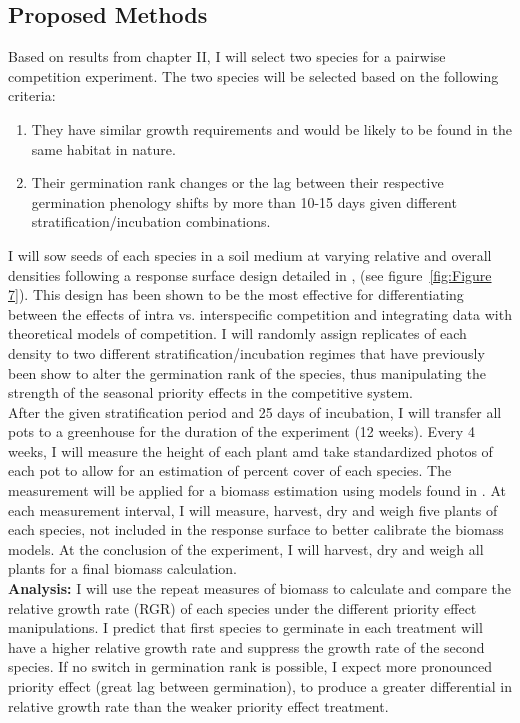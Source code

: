 \documentclass{article}\usepackage[]{graphicx}\usepackage[]{color}
\begin{document}
\subsection*{Proposed Methods}
\indent\indent Based on results from chapter II, I will select two species for a pairwise competition experiment. The two species will be selected based on the following criteria:
\begin{enumerate}
\item They have similar growth requirements and would be likely to be found in the same habitat in nature.
\item Their germination rank changes or the lag between their respective germination phenology shifts by more than 10-15 days given different stratification/incubation combinations.
\end{enumerate}
\indent\indent I will sow seeds of each species in a soil medium at varying relative and overall densities following a response surface design detailed in \cite{Inouye2001}, (see figure~\ref{fig:Figure 7}). This design has been shown to be the most effective for differentiating between the effects of intra vs. interspecific competition and integrating data with theoretical models of competition. I will randomly assign replicates of each density to two different stratification/incubation regimes that have previously been show to alter the germination rank of the species, thus manipulating the strength of the seasonal priority effects in the competitive system.\\
\indent After the given stratification period and 25 days of incubation, I will transfer all pots to a greenhouse for the duration of the experiment (12 weeks). Every 4 weeks, I will measure the height of each plant amd take standardized photos of each pot to allow for an estimation of percent cover of each species. The measurement will be applied for a biomass estimation using models found in \citet{Axmanova2012}. At each measurement interval, I will measure, harvest, dry and weigh five plants of each species, not included in the response surface to better calibrate the biomass models. At the conclusion of the experiment, I will harvest, dry and weigh all plants for a final biomass calculation.\\
\indent\textbf{Analysis:} I will use the repeat measures of biomass to calculate and compare the relative growth rate (RGR) \citep{Connolly2005} of each species under the different priority effect manipulations. I predict that first species to germinate in each treatment will have a higher relative growth rate and suppress the growth rate of the second species. If no switch in germination rank is possible, I expect more pronounced priority effect (great lag between germination), to produce a greater differential in relative growth rate than the weaker priority effect treatment.\\  
\end{document}
